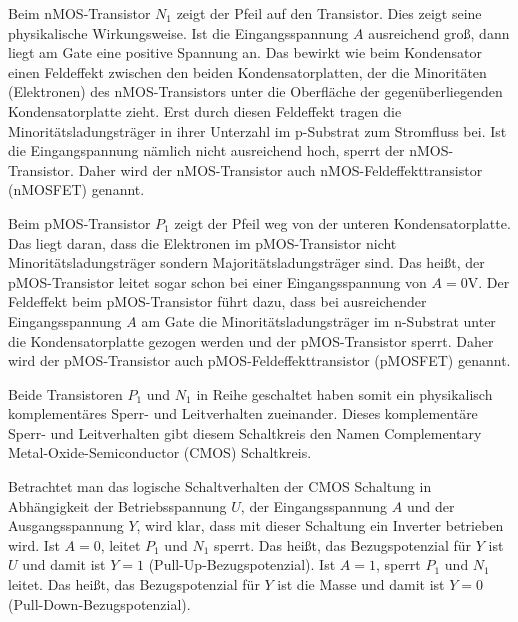 \documentclass{scrarticle}
\numberwithin{equation}{section}
\begin{document}
Beim nMOS-Transistor $N_1$ zeigt der Pfeil auf den Transistor. Dies zeigt seine physikalische Wirkungsweise. Ist die Eingangsspannung $A$ ausreichend groß, dann liegt am Gate eine positive Spannung an. Das bewirkt wie beim Kondensator einen Feldeffekt zwischen den beiden Kondensatorplatten, der die Minoritäten (Elektronen) des nMOS-Transistors unter die Oberfläche der gegenüberliegenden Kondensatorplatte zieht. Erst durch diesen Feldeffekt tragen die Minoritätsladungsträger in ihrer Unterzahl im p-Substrat zum Stromfluss bei. Ist die Eingangspannung nämlich nicht ausreichend hoch, sperrt der nMOS-Transistor. Daher wird der nMOS-Transistor auch nMOS-Feldeffekttransistor (nMOSFET) genannt.

Beim pMOS-Transistor $P_1$ zeigt der Pfeil weg von der unteren Kondensatorplatte. Das liegt daran, dass die Elektronen im pMOS-Transistor nicht Minoritätsladungsträger sondern Majoritätsladungsträger sind. Das heißt, der pMOS-Transistor leitet sogar schon bei einer Eingangsspannung von $A = 0\mathrm{V}$. Der Feldeffekt beim pMOS-Transistor führt dazu, dass bei ausreichender Eingangsspannung $A$ am Gate die Minoritätsladungsträger im n-Substrat unter die Kondensatorplatte gezogen werden und der pMOS-Transistor sperrt. Daher wird der pMOS-Transistor auch pMOS-Feldeffekttransistor (pMOSFET) genannt.

Beide Transistoren $P_1$ und $N_1$ in Reihe geschaltet haben somit ein physikalisch komplementäres Sperr- und Leitverhalten zueinander. Dieses komplementäre Sperr- und Leitverhalten gibt diesem Schaltkreis den Namen Complementary Metal-Oxide-Semiconductor (CMOS) Schaltkreis.

Betrachtet man das logische Schaltverhalten der CMOS Schaltung in Abhängigkeit der Betriebsspannung $U$, der Eingangsspannung $A$ und der Ausgangsspannung $Y$, wird klar, dass mit dieser Schaltung ein Inverter betrieben wird. Ist $A = 0$, leitet $P_1$ und $N_1$ sperrt. Das heißt, das Bezugspotenzial für $Y$ ist $U$ und damit ist $Y = 1$ (Pull-Up-Bezugspotenzial). Ist $A = 1$, sperrt $P_1$ und $N_1$ leitet. Das heißt, das Bezugspotenzial für $Y$ ist die Masse und damit ist $Y = 0$ (Pull-Down-Bezugspotenzial).
\end{document}
